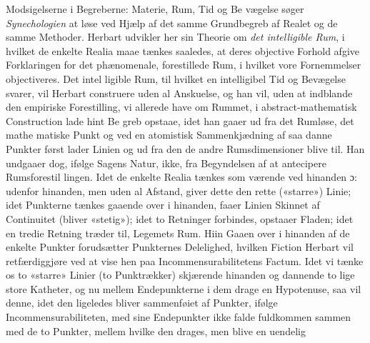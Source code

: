 \documentclass[12pt,a4paper]{book}
\begin{document}
Modsigelserne i Begreberne: Materie, Rum, Tid og Be\-%
vægelse søger \emph{Synechologien} at løse ved Hjælp af det
samme Grundbegreb af Realet og de samme Methoder. Herbart
udvikler her sin Theorie om \emph{det intelligible Rum}, i hvilket
de enkelte Realia maae tænkes saaledes, at deres objective
Forhold afgive Forklaringen for det phænomenale, forestillede
Rum, i hvilket vore Fornemmelser objectiveres. Det intel\-%
ligible Rum, til hvilket en intelligibel Tid og Bevægelse svarer,
vil Herbart construere uden al Anskuelse, og han vil, uden at
indblande den empiriske Forestilling, vi allerede have om
Rummet, i abstract-mathematisk Construction lade hint Be\-%
greb opstaae, idet han gaaer ud fra det Rumløse, det mathe\-%
matiske Punkt og ved en atomistisk Sammenkjædning af saa\-%
danne Punkter først lader Linien og ud fra den de andre
Rumsdimensioner blive til. Han undgaaer dog, ifølge Sagens
Natur, ikke, fra Begyndelsen af at antecipere Rumsforestil\-%
lingen. Idet de enkelte Realia tænkes som værende ved
hinanden ɔ: udenfor hinanden, men uden al Afstand, giver
dette den rette («starre») Linie; idet Punkterne tænkes gaaende
over i hinanden, faaer Linien Skinnet af Continuitet (bliver
«stetig»); idet to Retninger forbindes, opstaaer Fladen; idet
en tredie Retning træder til, Legemets Rum. Hiin Gaaen
over i hinanden af de enkelte Punkter forudsætter Punkternes
Delelighed, hvilken Fiction Herbart vil retfærdiggjøre ved at
vise hen paa Incommensurabilitetens Factum. Idet vi tænke
os to «starre» Linier (to Punktrækker) skjærende hinanden og
dannende to lige store Katheter, og nu mellem Endepunkterne
i dem drage en Hypotenuse, saa vil denne, idet den ligeledes
bliver sammenføiet af Punkter, ifølge Incommensurabiliteten,
med sine Endepunkter ikke falde fuldkommen sammen med de
to Punkter, mellem hvilke den drages, men blive en uendelig
\end{document}
